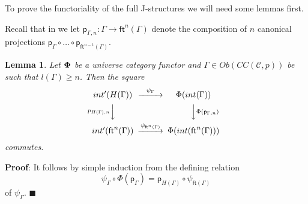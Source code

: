 \documentclass[12pt]{article}
\numberwithin{equation}{section}
\newenvironment{myproof}{{\bf Proof}:}{$\blacksquare$ \vskip 5mm }
\newtheorem{lemma}[proposition]{Lemma}
\newcommand{\llabel}[1]{\label{#1}}
\newcommand{\sr}{\rightarrow}
\newcommand{\toCC}{CC} %
\newcommand{\ft}{\mathsf{ft}}
\newcommand{\p}{\mathsf{p}}
\begin{document}
To prove the functoriality of the full J-structures we will need some lemmas
first.

Recall that in \cite{Csubsystems} we let $\p_{\Gamma,n}:\Gamma\sr \ft^n(\Gamma)$
denote the composition of $n$ canonical projections $\p_{\Gamma}\circ \dots\circ
\p_{\ft^{n-1}(\Gamma)}$.
%
\begin{lemma}
\llabel{2015.05.10.l1} Let ${\bf\Phi}$ be a universe category functor and
$\Gamma\in Ob(\toCC({\mathcal C},p))$ be such that $l(\Gamma)\ge n$. Then the
square
%
$$
\begin{CD}
int'(H(\Gamma)) @>\psi_{\Gamma}>> \Phi(int(\Gamma))\\ @Vp_{H(\Gamma),n} VV
@VV\Phi(\p_{\Gamma,n})V\\ int'(\ft^n(\Gamma)) @>\psi_{\ft^n(\Gamma)}>>
\Phi(int(\ft^n(\Gamma)))
\end{CD}
$$
%
commutes.
\end{lemma}
%
\begin{myproof}
It follows by simple induction from the defining relation
%
$$\psi_{\Gamma}\circ \Phi(\p_{\Gamma})=\p_{H(\Gamma)}\circ \psi_{\ft(\Gamma)}$$
%
of $\psi_{\Gamma}$.
\end{myproof}
\end{document}
